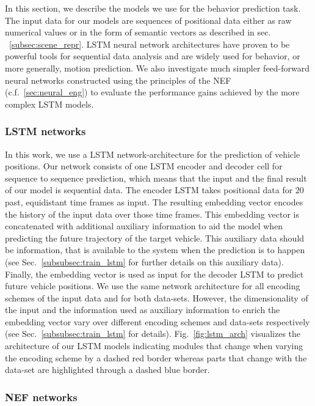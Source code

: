 In this section, we describe the models we use for the behavior prediction task.
The input data for our models are sequences of positional data either as raw numerical values or in the form of semantic vectors as described in sec. ~\ref{subsec:scene_repr}.
\ac{LSTM} neural network architectures have proven to be powerful tools for sequential data analysis and are widely used for behavior, or more generally, motion prediction.
We also investigate much simpler feed-forward neural networks constructed using the principles of the \acl{NEF} (c.f.~\ref{sec:neural_eng}) to evaluate the performance gains achieved by the more complex \ac{LSTM} models.

\subsubsection{\acs{LSTM} networks}
\label{subsubsec:lstm_models}
In this work, we use a \acf{LSTM} \cite{Hochreiter1997} network-architecture for the prediction of vehicle positions.
Our network consists of one \ac{LSTM} encoder and decoder cell for sequence to sequence prediction, which means that the input and the final result of our model is sequential data.
The encoder \ac{LSTM} takes positional data for $20$ past, equidistant time frames as input.
The resulting embedding vector encodes the history of the input data over those time frames.
This embedding vector is concatenated with additional auxiliary information to aid the model when predicting the future trajectory of the target vehicle.
This auxiliary data should be information, that is available to the system when the prediction is to happen (see Sec.~\ref{subsubsec:train_lstm} for further details on this auxiliary data).
Finally, the embedding vector is used as input for the decoder \ac{LSTM} to predict future vehicle positions.
We use the same network architecture for all encoding schemes of the input data and for both data-sets.
However, the dimensionality of the input and the information used as auxiliary information to enrich the embedding vector vary over different encoding schemes and data-sets respectively (see Sec.~\ref{subsubsec:train_lstm} for details).
Fig.~\ref{fig:lstm_arch} visualizes the architecture of our \ac{LSTM} models indicating modules that change when varying the encoding scheme by a dashed red border whereas parts that change with the data-set are highlighted through a dashed blue border.

\subsubsection{\acs{NEF} networks}
\label{subsubsec:nef_models}

